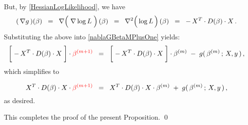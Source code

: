 \begin{enumerate}
	But, by \eqref{HessianLogLikelihood}, we have
	\begin{equation*}
	(\,\nabla g\,)(\beta)
	\;\; = \;\;
		\nabla\!\left(\;\overset{{\color{white}.}}{\nabla}\log L\;\right)(\beta)
	\;\; = \;\;
		\nabla^{2}\!\left(\,\overset{{\color{white}.}}{\log}\,L\,\right)(\beta)
	\;\; = \;\;
		-\, X^{T} \cdot D(\beta) \cdot X\,.
	\end{equation*}
	Substituting the above into \eqref{nablaGBetaMPlusOne} yields:
	\begin{equation*}
	\left[\; -\, X^{T} \cdot \overset{{\color{white}-}}{D}(\beta) \cdot X \;\right]
	\cdot
	{\color{red}\beta^{(m+1)}}
	\;\; = \;\;
		\left[\; -\, X^{T} \cdot \overset{{\color{white}-}}{D}(\beta) \cdot X \;\right]
		\cdot
		\beta^{(m)}
		\; - \;
		g(\,\beta^{(m)}\,;\,X,y\,)\,,
	\end{equation*}
	which simplifies to
	\begin{equation*}
	X^{T} \cdot \overset{{\color{white}-}}{D}(\beta) \cdot X
	\cdot
	{\color{red}\beta^{(m+1)}}
	\;\; = \;\;
		X^{T} \cdot \overset{{\color{white}-}}{D}(\beta) \cdot X
		\cdot
		\beta^{(m)}
		\; + \;
		g(\,\beta^{(m)}\,;\,X,y\,)\,,
	\end{equation*}
	as desired.
\end{enumerate}
This completes the proof of the present Proposition.
\qed


\renewcommand{\theenumi}{\roman{enumi}}
\renewcommand{\labelenumi}{\textnormal{(\theenumi)}$\;\;$}

